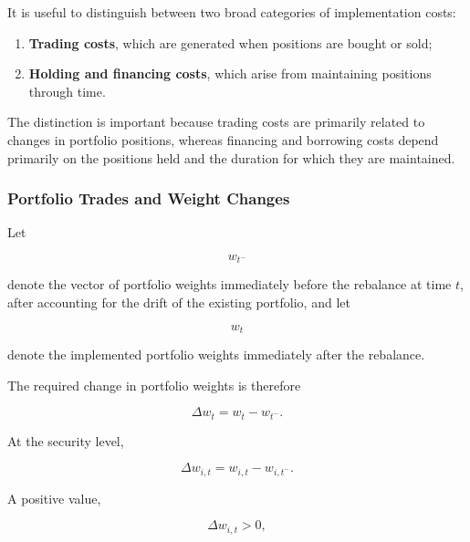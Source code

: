 \documentclass[11pt,a4paper]{article}
\begin{document}
It is useful to distinguish between two broad categories of implementation
costs:

\begin{enumerate}
    \item \textbf{Trading costs}, which are generated when positions are bought
    or sold;

    \item \textbf{Holding and financing costs}, which arise from maintaining
    positions through time.
\end{enumerate}

The distinction is important because trading costs are primarily related to
changes in portfolio positions, whereas financing and borrowing costs depend
primarily on the positions held and the duration for which they are maintained.


\subsubsection{Portfolio Trades and Weight Changes}

Let

\begin{equation}
w_{t^-}
\end{equation}

denote the vector of portfolio weights immediately before the rebalance at time
$t$, after accounting for the drift of the existing portfolio, and let

\begin{equation}
w_t
\end{equation}

denote the implemented portfolio weights immediately after the rebalance.

The required change in portfolio weights is therefore

\begin{equation}
\boxed{
\Delta w_t
=
w_t-w_{t^-}.
}
\end{equation}

At the security level,

\begin{equation}
\Delta w_{i,t}
=
w_{i,t}-w_{i,t^-}.
\end{equation}

A positive value,

\begin{equation}
\Delta w_{i,t}>0,
\end{equation}
\end{document}
